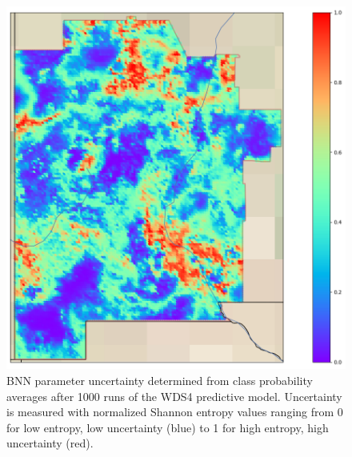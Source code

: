 \begin{figure}[!htp]
\centering
\includegraphics[width=.8\textwidth]{templates/images/Figure-BNN_Entropy_Map.png}
\caption[BNN parameter uncertainty map]
{BNN parameter uncertainty determined from class probability averages after 1000 runs of the WDS4 predictive model. Uncertainty is measured with normalized Shannon entropy values ranging from 0 for low entropy, low uncertainty (blue) to 1 for high entropy, high uncertainty (red).}
\label{fig:bnn_entropy_map}
\end{figure}

